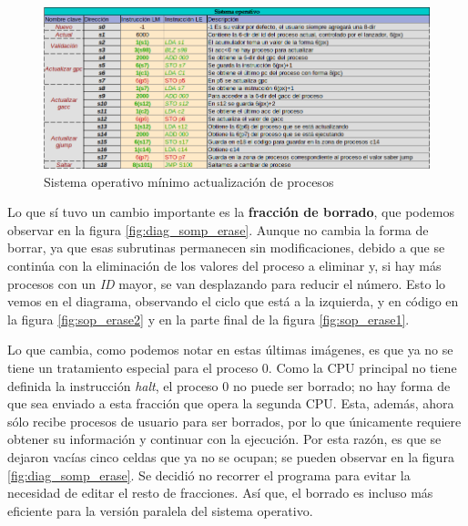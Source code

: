 \documentclass[letterpaper,12pt,oneside]{book}
\begin{document}
			\begin{figure}[H]		
				\centering
				\includegraphics[scale=0.53]{media/Paralela/sop_update.png}
				\caption{Sistema operativo mínimo actualización de procesos}
				\label{fig:sop_update}
			\end{figure}

			\newpage

			Lo que sí tuvo un cambio importante es la \textbf{fracción de borrado},
			que podemos observar en la figura \ref{fig:diag_somp_erase}. Aunque no cambia la forma de borrar, ya que esas subrutinas 
			permanecen sin modificaciones, debido a que
			se continúa con la eliminación de los valores del proceso a eliminar y, si hay más procesos con un \textit{ID} mayor, se van desplazando 
			para reducir el 
			número. Esto lo vemos en el diagrama, observando el ciclo 
			que está a la izquierda, y en código en la figura \ref{fig:sop_erase2} y en la parte
			final de la figura \ref{fig:sop_erase1}.
   
            Lo que cambia, como podemos notar en estas últimas imágenes, es que ya no se tiene un tratamiento especial
			para el proceso 0. Como la CPU principal no tiene definida la instrucción \textit{halt}, el proceso 0 no puede ser borrado; no hay forma
			de que sea enviado a esta fracción que opera la segunda CPU. Esta, además,
			ahora sólo recibe procesos de usuario para ser borrados, por lo que únicamente requiere 
			obtener
			su información y continuar con la ejecución. Por esta razón,
			es que se dejaron vacías cinco celdas que ya no se ocupan; se pueden observar en la figura \ref{fig:diag_somp_erase}.
			Se decidió no recorrer el 
			programa
			para evitar la necesidad de editar el resto de fracciones. Así que, el borrado es incluso más eficiente para
			la versión paralela del sistema operativo.
			
\end{document}

